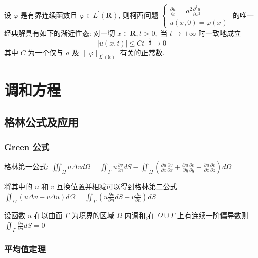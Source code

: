\documentclass[10pt]{yerbaformat}
\begin{document}
\begin{theorem}
    设 $\varphi$ 是有界连续函数且 $\varphi \in L^{\prime}(\mathbf{R})$, 则柯西问题 $\left\{\begin{array}{l}\frac{\partial u}{\partial t}=a^{2} \frac{\partial^{2} u}{\partial x^{2}} \\ u(x, 0)=\varphi(x)\end{array}\right.$ 的唯一经典解具有如下的渐近性态: 对一切 $x \in \mathbf{R}, t>0,$ 当 $t \rightarrow+\infty$ 时一致地成立 $$|u(x, t)| \leqslant C t^{-\frac{1}{2}} \rightarrow 0 $$ 其中 $C$ 为一个仅与 $a$ 及 $\|\varphi\|_{L^{\prime}(\mathrm{k})}$ 有关的正常数.
\end{theorem}

\section{调和方程}

\subsection{格林公式及应用}
\subsubsection{Green 公式}

\par 格林第一公式: $\iiint_{\Omega} u \Delta v d \Omega =\iint_{\varGamma } u \frac{\partial v}{\partial n} d S-\iint_{\Omega}\left(\frac{\partial u}{\partial x} \frac{\partial v}{\partial x}+\frac{\partial u}{\partial y} \frac{\partial v}{\partial y}+\frac{\partial u}{\partial z} \frac{\partial v}{\partial z}\right) d \Omega$

\par 将其中的 $u$ 和 $v$ 互换位置并相减可以得到格林第二公式 $\iint_{\Omega}(u \Delta v-v \Delta u) d \Omega=\iint_{\Gamma}\left(u \frac{\partial v}{\partial n} d S-v \frac{d u}{\partial n}\right) d S$

\begin{theorem}
    设函数 $u$ 在以曲面 $\Gamma$ 为境界的区域 $\Omega$ 内调和,在 $\Omega \cup \Gamma$ 上有连续一阶偏导数则 $\iint_{\Gamma} \frac{\partial u}{\partial n} d S=0$
\end{theorem}

\subsubsection{平均值定理}
\end{document}
